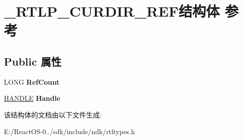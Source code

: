 \hypertarget{struct___r_t_l_p___c_u_r_d_i_r___r_e_f}{}\section{\+\_\+\+R\+T\+L\+P\+\_\+\+C\+U\+R\+D\+I\+R\+\_\+\+R\+E\+F结构体 参考}
\label{struct___r_t_l_p___c_u_r_d_i_r___r_e_f}
\subsection*{Public 属性}
\begin{DoxyCompactItemize}
\item 
\mbox{\label{struct___r_t_l_p___c_u_r_d_i_r___r_e_f_a7065d736a55b56fb632d3b5cf3fac63d}} 
L\+O\+NG {\bfseries Ref\+Count}
\item 
\mbox{\label{struct___r_t_l_p___c_u_r_d_i_r___r_e_f_a0739519e9c9fff4b805f7ed6191912c2}} 
\hyperlink{interfacevoid}{H\+A\+N\+D\+LE} {\bfseries Handle}
\end{DoxyCompactItemize}


该结构体的文档由以下文件生成\+:\begin{DoxyCompactItemize}
\item 
E\+:/\+React\+O\+S-\/0../sdk/include/ndk/rtltypes.\+h\end{DoxyCompactItemize}
